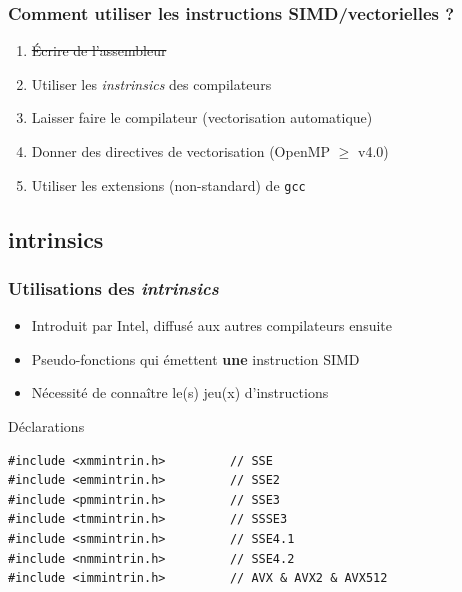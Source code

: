 \documentclass[xcolor={x11names,svgnames}]{beamer}
\begin{document}
\begin{frame}
  \frametitle{Comment utiliser les instructions SIMD/vectorielles ?}

  \begin{enumerate}
  \item \sout{Écrire de l'assembleur}

    \medskip
    
  \item Utiliser les \og \textit{instrinsics}\fg{} des compilateurs

\medskip
    
  \item Laisser faire le compilateur (vectorisation automatique)

\medskip
    
  \item Donner des directives de vectorisation (OpenMP $\geq$ v4.0)

    \medskip
    
  \item Utiliser les extensions (non-standard) de \texttt{gcc}

  \end{enumerate}
  
\end{frame}




\subsection{intrinsics}

\begin{frame}[fragile=singleslide]
  \frametitle{Utilisations des \emph{intrinsics}}

  \begin{itemize}
  \item Introduit par Intel, diffusé aux autres compilateurs ensuite
  \item Pseudo-fonctions qui émettent \textbf{une} instruction SIMD
  \item Nécessité de connaître le(s) jeu(x) d'instructions
  \end{itemize}
  
  
\begin{block}{Déclarations}
  \begin{verbatim}
#include <xmmintrin.h>         // SSE
#include <emmintrin.h>         // SSE2
#include <pmmintrin.h>         // SSE3
#include <tmmintrin.h>         // SSSE3
#include <smmintrin.h>         // SSE4.1
#include <nmmintrin.h>         // SSE4.2
#include <immintrin.h>         // AVX & AVX2 & AVX512
\end{verbatim}
\end{block}

\end{frame}
\end{document}
